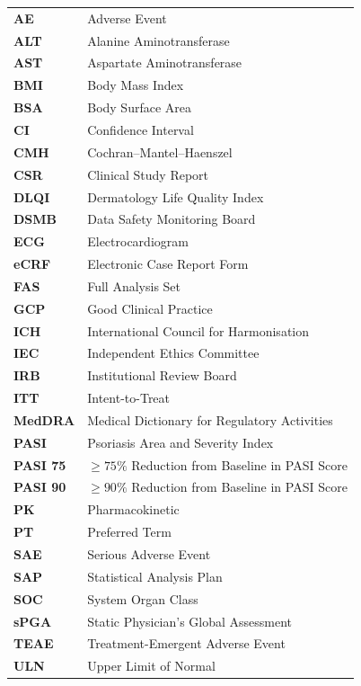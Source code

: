\documentclass[11pt, a4paper]{article}
\begin{document}
\renewcommand{\arraystretch}{1.15}
\begin{tabularx}{\linewidth}{@{}>{\bfseries}l@{\hspace{5mm}}X@{}}
AE        & Adverse Event \\
ALT       & Alanine Aminotransferase \\
AST       & Aspartate Aminotransferase \\
BMI       & Body Mass Index \\
BSA       & Body Surface Area \\
CI        & Confidence Interval \\
CMH       & Cochran--Mantel--Haenszel \\
CSR       & Clinical Study Report \\
DLQI      & Dermatology Life Quality Index \\
DSMB      & Data Safety Monitoring Board \\
ECG       & Electrocardiogram \\
eCRF      & Electronic Case Report Form \\
FAS       & Full Analysis Set \\
GCP       & Good Clinical Practice \\
ICH       & International Council for Harmonisation \\
IEC       & Independent Ethics Committee \\
IRB       & Institutional Review Board \\
ITT       & Intent-to-Treat \\
MedDRA    & Medical Dictionary for Regulatory Activities \\
PASI      & Psoriasis Area and Severity Index \\
PASI 75   & $\ge 75\%$ Reduction from Baseline in PASI Score \\
PASI 90   & $\ge 90\%$ Reduction from Baseline in PASI Score \\
PK        & Pharmacokinetic \\
PT        & Preferred Term \\
SAE       & Serious Adverse Event \\
SAP       & Statistical Analysis Plan \\
SOC       & System Organ Class \\
sPGA      & Static Physician's Global Assessment \\
TEAE      & Treatment-Emergent Adverse Event \\
ULN       & Upper Limit of Normal \\
\end{tabularx}
\renewcommand{\arraystretch}{1.0}
\end{document}

